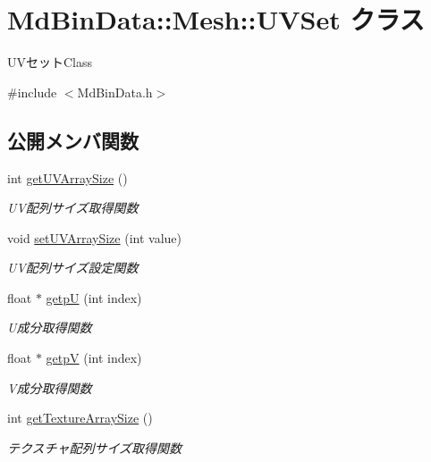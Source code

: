 \hypertarget{class_md_bin_data_1_1_mesh_1_1_u_v_set}{}\section{Md\+Bin\+Data\+:\+:Mesh\+:\+:U\+V\+Set クラス}
\label{class_md_bin_data_1_1_mesh_1_1_u_v_set}


U\+Vセット\+Class  




{\ttfamily \#include $<$Md\+Bin\+Data.\+h$>$}

\subsection*{公開メンバ関数}
\begin{DoxyCompactItemize}
\item 
int \mbox{\hyperlink{class_md_bin_data_1_1_mesh_1_1_u_v_set_a048625e24071483a7a64c9baa7dbccc0}{get\+U\+V\+Array\+Size}} ()
\begin{DoxyCompactList}\small\item\em U\+V配列サイズ取得関数 \end{DoxyCompactList}\item 
void \mbox{\hyperlink{class_md_bin_data_1_1_mesh_1_1_u_v_set_a0f5b0eb698b41db7b798e66082f862ef}{set\+U\+V\+Array\+Size}} (int value)
\begin{DoxyCompactList}\small\item\em U\+V配列サイズ設定関数 \end{DoxyCompactList}\item 
float $\ast$ \mbox{\hyperlink{class_md_bin_data_1_1_mesh_1_1_u_v_set_accaf305a5e973a2538f25f5f95c56e91}{getpU}} (int index)
\begin{DoxyCompactList}\small\item\em U成分取得関数 \end{DoxyCompactList}\item 
float $\ast$ \mbox{\hyperlink{class_md_bin_data_1_1_mesh_1_1_u_v_set_aff2ba32a6da478023d50902b9f40e8cd}{getpV}} (int index)
\begin{DoxyCompactList}\small\item\em V成分取得関数 \end{DoxyCompactList}\item 
int \mbox{\hyperlink{class_md_bin_data_1_1_mesh_1_1_u_v_set_a37134fc2d95dc610c985235d75405f3e}{get\+Texture\+Array\+Size}} ()
\begin{DoxyCompactList}\small\item\em テクスチャ配列サイズ取得関数 \end{DoxyCompactList}\item 

\end{DoxyCompactItemize}

